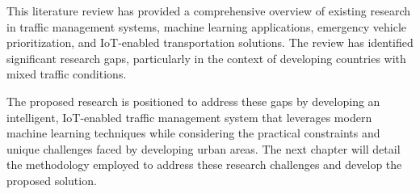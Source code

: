 This literature review has provided a comprehensive overview of existing research in traffic management systems, machine learning applications, emergency vehicle prioritization, and IoT-enabled transportation solutions. The review has identified significant research gaps, particularly in the context of developing countries with mixed traffic conditions.

The proposed research is positioned to address these gaps by developing an intelligent, IoT-enabled traffic management system that leverages modern machine learning techniques while considering the practical constraints and unique challenges faced by developing urban areas. The next chapter will detail the methodology employed to address these research challenges and develop the proposed solution. 